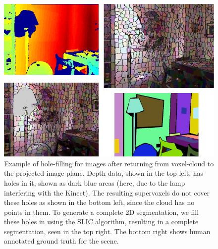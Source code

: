 \begin{figure}
\begin{center}
\includegraphics[width=0.9\linewidth]{figures/CVPR2013/BackTo2D.pdf}
\end{center}
   \caption[2D Hole Filling]{Example of hole-filling for images after returning from voxel-cloud to the projected image plane. Depth data, shown in the top left, has holes in it, shown as dark blue areas (here, due to the lamp interfering with the Kinect). The resulting supervoxels do not cover these holes as shown in the bottom left, since the cloud has no points in them. To generate a complete 2D segmentation, we fill these holes in using the SLIC algorithm, resulting in a complete segmentation, seen in the top right. The bottom right shows human annotated ground truth for the scene. }
\label{fig:ReturnToPlane}
\end{figure}


